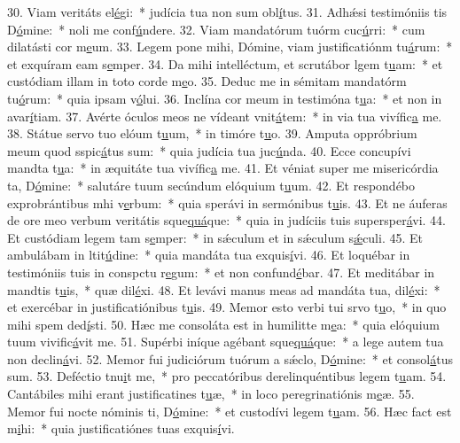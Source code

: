 30. Viam veritáts el\uline{é}gi:~* judícia tua non sum obl\uline{í}tus.
31. Adhǽsi testimóniis tis D\uline{ó}mine:~* noli me conf\uline{ú}ndere.
32. Viam mandatórum tuórm cuc\uline{ú}rri:~* cum dilatásti cor m\uline{e}um.
33. Legem pone mihi, Dómine, viam justificatiónm tu\uline{á}rum:~* et exquíram eam s\uline{e}mper.
34. Da mihi intelléctum, et scrutábor lgem t\uline{u}am:~* et custódiam illam in toto corde m\uline{e}o.
35. Deduc me in sémitam mandatórm tu\uline{ó}rum:~* quia ipsam v\uline{ó}lui.
36. Inclína cor meum in testimóna t\uline{u}a:~* et non in avar\uline{í}tiam.
37. Avérte óculos meos ne vídeant vnit\uline{á}tem:~* in via tua vivífic\uline{a} me.
38. Státue servo tuo elóum t\uline{u}um,~* in timóre t\uline{u}o.
39. Amputa oppróbrium meum quod sspic\uline{á}tus sum:~* quia judícia tua juc\uline{ú}nda.
40. Ecce concupívi mandta t\uline{u}a:~* in æquitáte tua vivífic\uline{a} me.
41. Et véniat super me misericórdia ta, D\uline{ó}mine:~* salutáre tuum secúndum elóquium t\uline{u}um.
42. Et respondébo exprobrántibus mhi v\uline{e}rbum:~* quia sperávi in sermónibus t\uline{u}is.
43. Et ne áuferas de ore meo verbum veritátis sque\uline{quá}que:~* quia in judíciis tuis supersper\uline{á}vi.
44. Et custódiam legem tam s\uline{e}mper:~* in sǽculum et in sǽculum s\uline{ǽ}culi.
45. Et ambulábam in ltit\uline{ú}dine:~* quia mandáta tua exquis\uline{í}vi.
46. Et loquébar in testimóniis tuis in conspctu r\uline{e}gum:~* et non confund\uline{é}bar.
47. Et meditábar in mandtis t\uline{u}is,~* quæ dil\uline{é}xi.
48. Et levávi manus meas ad mandáta tua,  dil\uline{é}xi:~* et exercébar in justificatiónibus t\uline{u}is.
49. Memor esto verbi tui srvo t\uline{u}o,~* in quo mihi spem ded\uline{í}sti.
50. Hæc me consoláta est in humilitte m\uline{e}a:~* quia elóquium tuum vivific\uline{á}vit me.
51. Supérbi iníque agébant sque\uline{quá}que:~* a lege autem tua non declin\uline{á}vi.
52. Memor fui judiciórum tuórum a sǽclo, D\uline{ó}mine:~* et consol\uline{á}tus sum.
53. Deféctio tnu\uline{i}t me,~* pro peccatóribus derelinquéntibus legem t\uline{u}am.
54. Cantábiles mihi erant justificatines t\uline{u}æ,~* in loco peregrinatiónis m\uline{e}æ.
55. Memor fui nocte nóminis ti, D\uline{ó}mine:~* et custodívi legem t\uline{u}am.
56. Hæc fact est m\uline{i}hi:~* quia justificatiónes tuas exquis\uline{í}vi.
